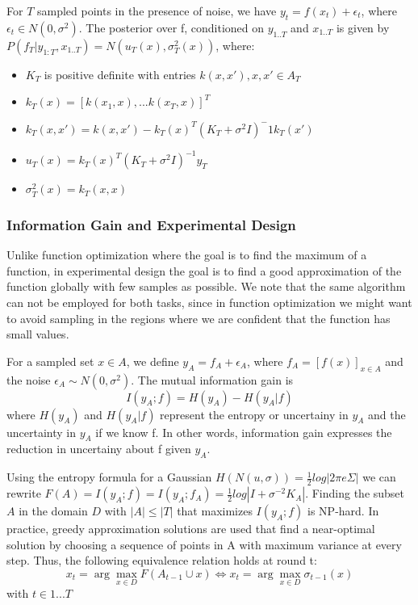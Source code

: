 \documentclass[10pt,journal,a4paper]{IEEEtran}
\begin{document}
For $T$ sampled points in the presence of noise, we have $y_t = f(x_t) + \epsilon_t$, where $\epsilon_t \in N(0,\sigma^2)$. The posterior over f, conditioned on $y_{1..T}$ and $x_{1..T}$ is given by
$P(f_T| y_{1:T},x_{1..T}) = N(u_T(x), \sigma_T^2(x))$, where: 
\begin{itemize}
	\item $K_T$ is positive definite with entries $k(x,x'), x,x' \in A_T$   
	\item $k_T(x) = [k(x_1,x),...k(x_T,x)]^T$	
	\item $k_{T}(x,x') = k(x,x') - k_T(x)^T(K_T+\sigma^2I)^-1k_T(x')$
	\item $u_{T}(x) = k_{T}(x)^{T}(K_T + \sigma^2I)^{-1} y_{T}$
	\item $\sigma_T^2(x) =  k_{T}(x,x)$
\end{itemize}

\subsubsection{Information Gain and Experimental Design}

Unlike function optimization where the goal is to find the maximum of a function, in experimental design the goal is to find a good approximation of the function globally with few samples as possible. We note that the same algorithm can not be employed for both tasks, since in function optimization we might want to avoid sampling in the regions where we are confident that the function has small values.

For a sampled set $x\in A$, we define $y_A = f_A + \epsilon_A$, where  $f_A=[f(x)]_{x \in A}$ and the noise $\epsilon_A \sim N(0,\sigma^2)$.
 The mutual information gain is
\begin{equation}
	I(y_A; f) = H(y_A) - H(y_A| f)
\end{equation}
where $H(y_A)$ and $H(y_A|f)$ represent the entropy or uncertainy in $y_A$ and 
the uncertainty in $y_A$ if we know f. In other words, information gain expresses the reduction in uncertainy about f given $y_A$.

Using the entropy formula for a Gaussian $H(N(u,\sigma)) =\frac{1}{2}log|2\pi e \Sigma|$ we can rewrite $F(A) =I(y_A; f)  = I(y_A; f_A) = \frac{1}{2} log|I + \sigma^{-2} K_A|$.
Finding the subset $A$ in the domain $D$ with $|A| \leq |T|$ that maximizes $I(y_A; f)$ is NP-hard. In practice, greedy approximation solutions are used that find a near-optimal solution by choosing a sequence of points in A with maximum variance at every step. Thus, the following equivalence relation holds at round t:
\begin{equation}
x_t = \arg\max_{x\in D} F(A_{t-1}\cup {x}) \Longleftrightarrow 
x_t = \arg\max_{x\in D}\sigma_{t-1}(x) 
\end{equation}
with $t\in{1...T}$
\end{document}

